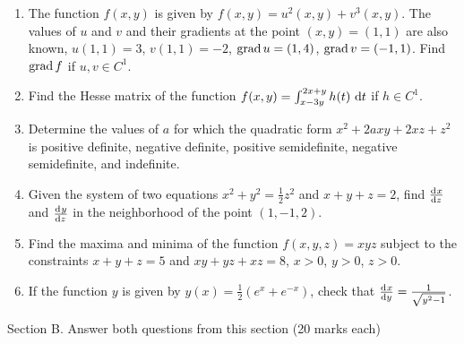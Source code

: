 \begin{enumerate}

\item The function $f(x,y)$ is given by $f(x,y)=u^2(x,y)+v^3(x,y)$. The values of $u$ and $v$ and their gradients at the point $(x,y)=(1,1)$ are also known, $u(1,1)=3$, $v(1,1)=-2$, $\mathrm{grad}\, u=(1,4)$, $\mathrm{grad}\, v=(-1,1)$. Find $\mathrm{grad}\, f$ if $u,v \in C^1$.
\item Find the Hesse matrix of the function $f(x,y)=\int_{x-3y}^{2x+y}h(t)\,\dif t$ if $h\in C^1$.

\item Determine the values of $a$ for which the quadratic form $x^2 + 2axy + 2xz + z^2$ is positive definite, negative definite, positive semidefinite, negative semidefinite, and indefinite.

\item Given the system of two equations $x^2+y^2=\frac{1}{2}z^2$ and $x+y+z=2$, find $\od{x}{z}$ and $\od{y}{z}$ in the neighborhood of the point $(1,-1,2)$.

\item Find the maxima and minima of the function $f(x,y,z)=xyz$ subject to the constraints $x+y+z=5$ and $xy+yz+xz=8$, $x>0$, $y>0$, $z>0$.

\item If the function $y$ is given by $y(x)=\frac{1}{2}(e^x+e^{-x})$, check that $\od{x}{y}=\frac{1}{\sqrt{y^2-1}} $.
\end{enumerate}

Section B. Answer both questions from this section (20 marks each) \\

